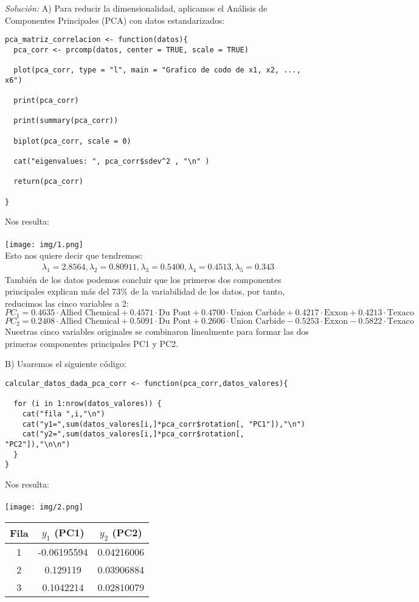 \documentclass[12pt]{article}
\newenvironment{sol}
    {\emph{Solución:}
    }
    {
    }
\begin{document}
\begin{sol}A)
Para reducir la dimensionalidad, aplicamos el Análisis de Componentes Principales (PCA) con datos estandarizados:
\begin{verbatim}
pca_matriz_correlacion <- function(datos){
  pca_corr <- prcomp(datos, center = TRUE, scale = TRUE)

  plot(pca_corr, type = "l", main = "Grafico de codo de x1, x2, ..., x6")

  print(pca_corr)

  print(summary(pca_corr))

  biplot(pca_corr, scale = 0)

  cat("eigenvalues: ", pca_corr$sdev^2 , "\n" )

  return(pca_corr)

}
\end{verbatim}
Nos resulta:\\\\
\texttt{[image: img/1.png]}\\
Esto nos quiere decir que tendremos:
\begin{align*}
\lambda_1 = 2.8564, \lambda_2 = 0.80911, \lambda_3 = 0.5400, \lambda_4 = 0.4513 , \lambda_5 = 0.343
\end{align*}
También de los datos podemos concluir que los primeros dos componentes principales explican más del 73\% de la variabilidad de los datos, por tanto, reducimos las cinco variables a 2:
\[
PC_1 = 0.4635 \cdot \text{Allied Chemical} + 0.4571 \cdot \text{Du Pont} + 0.4700 \cdot \text{Union Carbide} + 0.4217 \cdot \text{Exxon} + 0.4213 \cdot \text{Texaco}
\]
\[
PC_2 = 0.2408 \cdot \text{Allied Chemical} + 0.5091 \cdot \text{Du Pont} + 0.2606 \cdot \text{Union Carbide} - 0.5253 \cdot \text{Exxon} - 0.5822 \cdot \text{Texaco}
\]
Nuestras cinco variables originales se combinaron linealmente para formar las dos primeras componentes principales PC1 y PC2.

\pagebreak

B) Usaremos el siguiente código: 
\begin{verbatim}
calcular_datos_dada_pca_corr <- function(pca_corr,datos_valores){

  for (i in 1:nrow(datos_valores)) {
    cat("fila ",i,"\n")
    cat("y1=",sum(datos_valores[i,]*pca_corr$rotation[, "PC1"]),"\n")
    cat("y2=",sum(datos_valores[i,]*pca_corr$rotation[, "PC2"]),"\n\n")
  }
}
\end{verbatim}
Nos resulta:\\\\
\texttt{[image: img/2.png]}\\
\begin{table}[h]
    \centering
    \begin{tabular}{|c|c|c|}
        \hline
        \textbf{Fila} & \textbf{$y_1$ (PC1)} & \textbf{$y_2$ (PC2)} \\
        \hline
        1 & -0.06195594 & 0.04216006 \\
        2 & 0.129119 & 0.03906884 \\
        3 & 0.1042214 & 0.02810079 \\
        \hline
    \end{tabular}


\end{table}
\end{sol}
\end{document}
